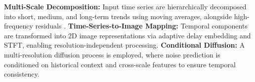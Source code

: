 \textbf{Multi-Scale Decomposition:} Input time series are hierarchically decomposed into short, medium, and long-term trends using moving averages, alongside high-frequency residuals \cite{shen2024mr_diff}. 
\textbf{Time-Series-to-Image Mapping:} Temporal components are transformed into 2D image representations via adaptive delay embedding and STFT\cite{DBLP:journals/cssp/IshwaryaK25}, enabling resolution-independent processing. 
\textbf{Conditional Diffusion:} A multi-resolution diffusion process is employed, where noise prediction is conditioned on historical context and cross-scale features to ensure temporal consistency.